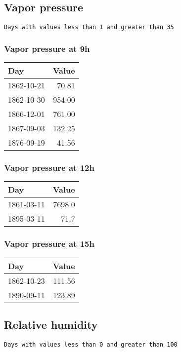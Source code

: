 \documentclass[]{article}
\begin{document}
\subsection{Vapor pressure}\label{vapor-pressure-1}

\begin{verbatim}
Days with values less than 1 and greater than 35
\end{verbatim}

\subsubsection{Vapor pressure at 9h}\label{vapor-pressure-at-9h-1}

\begin{longtable}[]{@{}lr@{}}
\toprule
Day & Value\tabularnewline
\midrule
\endhead
1862-10-21 & 70.81\tabularnewline
1862-10-30 & 954.00\tabularnewline
1866-12-01 & 761.00\tabularnewline
1867-09-03 & 132.25\tabularnewline
1876-09-19 & 41.56\tabularnewline
\bottomrule
\end{longtable}

\subsubsection{Vapor pressure at 12h}\label{vapor-pressure-at-12h-1}

\begin{longtable}[]{@{}lr@{}}
\toprule
Day & Value\tabularnewline
\midrule
\endhead
1861-03-11 & 7698.0\tabularnewline
1895-03-11 & 71.7\tabularnewline
\bottomrule
\end{longtable}

\subsubsection{Vapor pressure at 15h}\label{vapor-pressure-at-15h}

\begin{longtable}[]{@{}lr@{}}
\toprule
Day & Value\tabularnewline
\midrule
\endhead
1862-10-23 & 111.56\tabularnewline
1890-09-11 & 123.89\tabularnewline
\bottomrule
\end{longtable}

\subsection{Relative humidity}\label{relative-humidity-1}

\begin{verbatim}
Days with values less than 0 and greater than 100
\end{verbatim}
\end{document}
